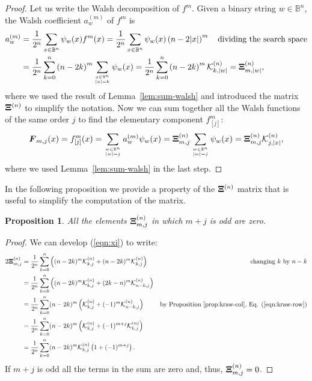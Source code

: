 \documentclass{article}
\newtheorem{proposition}{Proposition}
\def\vec#1{\mathchoice{\mbox{\boldmath$\displaystyle#1$}}
  {\mbox{\boldmath$\textstyle#1$}}
  {\mbox{\boldmath$\scriptstyle#1$}}
  {\mbox{\boldmath$\scriptscriptstyle#1$}}}
\newcommand{\Bo}[0]{\mathbb{B}}
\newcommand{\krawel}[3]{\mathcal{K}^{#1}_{#2,#3}}
\begin{document}
\begin{proof}
Let us write the Walsh decomposition of $f^m$. Given a binary string $w \in \Bo^n$, the Walsh coefficient $a^{(m)}_{w}$ of $f^m$ is
\begin{align}
a^{(m)}_{w} &= \frac{1}{2^n}\sum_{x \in \Bo^n} \psi_{w} (x) f^m(x) 
= \frac{1}{2^n}\sum_{x \in \Bo^n} \psi_{w} (x) \left(n-2|x|\right)^m  ~~~\text{dividing the search space} \notag \\
&= \frac{1}{2^n} \sum_{k=0}^{n} \left(n-2k\right)^m \sum_{x \in \Bo^n \atop |x|=k} \psi_{w} (x) = \frac{1}{2^n} \sum_{k=0}^{n} \left(n-2k\right)^m \krawel{(n)}{k}{|w|} = \vec{\Xi}^{(n)}_{m,|w|} ,
\end{align}
where we used the result of Lemma~\ref{lem:sum-walsh} and introduced the matrix $\vec{\Xi}^{(n)}$ to simplify the notation. Now we can sum together all the Walsh functions of the same order $j$ to find the elementary component $f^m_{[j]}$:
\begin{align}
\label{eqn:fmatrix-onemax}
\vec{F}_{m,j} (x) = f^m_{[j]}(x) = \sum_{w \in \Bo^n \atop |w| = j}  a^{(m)}_{w} \psi_{w}(x) = 
\vec{\Xi}^{(n)}_{m,j} \sum_{w \in \Bo^n \atop |w| = j}  \psi_{w}(x) = \vec{\Xi}^{(n)}_{m,j} \krawel{(n)}{j}{|x|}  ,
\end{align}
where we used Lemma~\ref{lem:sum-walsh} in the last step.
\end{proof}

In the following proposition we provide a property of the $\vec{\Xi}^{(n)}$ matrix that is useful to simplify the computation of the matrix.

\begin{proposition}
All the elements $\vec{\Xi}^{(n)}_{m,j}$ in which $m + j$ is odd are zero. 
\end{proposition}
\begin{proof}
We can develop (\ref{eqn:xi}) to write:
\begin{align}
2\vec{\Xi}^{(n)}_{m,j} &= \frac{1}{2^n} \sum_{k=0}^n \left((n-2k)^m \krawel{(n)}{k}{j} + (n-2k)^m \krawel{(n)}{k}{j}\right) & \text{changing $k$ by $n-k$} \nonumber \\
&= \frac{1}{2^n} \sum_{k=0}^n \left((n-2k)^m \krawel{(n)}{k}{j} + (2k-n)^m \krawel{(n)}{n-k}{j}\right) \nonumber \\
&= \frac{1}{2^n} \sum_{k=0}^n (n-2k)^m \left( \krawel{(n)}{k}{j} + (-1)^m \krawel{(n)}{n-k}{j}\right) & \text{by Proposition~\ref{prop:kraw-col}, Eq. (\ref{eqn:kraw-row})} \nonumber \\
&= \frac{1}{2^n} \sum_{k=0}^n (n-2k)^m \left( \krawel{(n)}{k}{j} + (-1)^{m+j} \krawel{(n)}{k}{j}\right) \nonumber \\
&= \frac{1}{2^n} \sum_{k=0}^n (n-2k)^m \krawel{(n)}{k}{j} \left(1  + (-1)^{m+j} \right) . \nonumber
\end{align}
If $m+j$ is odd all the terms in the sum are zero and, thus, $\vec{\Xi}^{(n)}_{m,j}=0$.
\end{proof}
\end{document}
